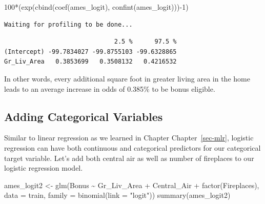 \documentclass[
  letterpaper,
  DIV=11,
  numbers=noendperiod]{scrreprt}
\newenvironment{Shaded}{\begin{snugshade}}{\end{snugshade}}
\newcommand{\AttributeTok}[1]{\textcolor[rgb]{0.40,0.45,0.13}{#1}}
\newcommand{\DecValTok}[1]{\textcolor[rgb]{0.68,0.00,0.00}{#1}}
\newcommand{\FunctionTok}[1]{\textcolor[rgb]{0.28,0.35,0.67}{#1}}
\newcommand{\NormalTok}[1]{\textcolor[rgb]{0.00,0.23,0.31}{#1}}
\newcommand{\OtherTok}[1]{\textcolor[rgb]{0.00,0.23,0.31}{#1}}
\newcommand{\SpecialCharTok}[1]{\textcolor[rgb]{0.37,0.37,0.37}{#1}}
\newcommand{\StringTok}[1]{\textcolor[rgb]{0.13,0.47,0.30}{#1}}
\begin{document}
\begin{Shaded}
\begin{Highlighting}[]
\DecValTok{100}\SpecialCharTok{*}\NormalTok{(}\FunctionTok{exp}\NormalTok{(}\FunctionTok{cbind}\NormalTok{(}\FunctionTok{coef}\NormalTok{(ames\_logit), }\FunctionTok{confint}\NormalTok{(ames\_logit)))}\SpecialCharTok{{-}}\DecValTok{1}\NormalTok{)}
\end{Highlighting}
\end{Shaded}

\begin{verbatim}
Waiting for profiling to be done...
\end{verbatim}

\begin{verbatim}
                              2.5 %      97.5 %
(Intercept) -99.7834027 -99.8755103 -99.6328865
Gr_Liv_Area   0.3853699   0.3508132   0.4216532
\end{verbatim}

In other words, every additional square foot in greater living area in
the home leads to an average increase in odds of 0.385\% to be bonus
eligible.

\hypertarget{adding-categorical-variables}{%
\subsection{Adding Categorical
Variables}\label{adding-categorical-variables}}

Similar to linear regression as we learned in Chapter
Chapter~\ref{sec-mlr}, logistic regression can have both continuous and
categorical predictors for our categorical target variable. Let's add
both central air as well as number of fireplaces to our logistic
regression model.

\begin{Shaded}
\begin{Highlighting}[]
\NormalTok{ames\_logit2 }\OtherTok{\textless{}{-}} \FunctionTok{glm}\NormalTok{(Bonus }\SpecialCharTok{\textasciitilde{}}\NormalTok{ Gr\_Liv\_Area }\SpecialCharTok{+}\NormalTok{ Central\_Air }\SpecialCharTok{+} \FunctionTok{factor}\NormalTok{(Fireplaces), }
                  \AttributeTok{data =}\NormalTok{ train, }\AttributeTok{family =} \FunctionTok{binomial}\NormalTok{(}\AttributeTok{link =} \StringTok{"logit"}\NormalTok{))}
\FunctionTok{summary}\NormalTok{(ames\_logit2)}
\end{Highlighting}
\end{Shaded}
\end{document}
